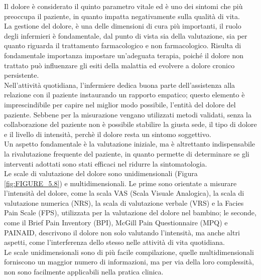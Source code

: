 Il dolore è considerato il quinto parametro vitale ed è uno dei sintomi che più preoccupa il paziente, 
in quanto impatta negativamente sulla qualità di vita.\\ La gestione del dolore, 
è una delle dimensioni di cura più importanti, il ruolo degli infermieri è fondamentale, 
dal punto di vista sia della valutazione, sia per quanto riguarda il trattamento farmacologico e non farmacologico. 
Risulta di fondamentale importanza impostare un’adeguata terapia, poiché il dolore non trattato può 
influenzare gli esiti della malattia ed evolvere a dolore cronico persistente.\\
Nell'attività quotidiana, l'infermiere dedica buona parte dell'assistenza alla relazione con il paziente instaurando
un rapporto empatico; questo elemento è imprescindibile per capire nel miglior modo possibile, l'entità del
dolore del paziente. Sebbe­ne per la misurazione vengano utilizzati metodi validati, senza la collabo­razione del 
paziente non è possibile stabilire la giusta sede, il tipo di dolo­re e il livello di intensità, 
perchè il dolore resta un sintomo soggettivo\cite{BOOK3}.\\
Un aspetto fondamentale è la valutazione iniziale, ma è altret­tanto indispensabile la rivalutazione frequente del paziente, 
in quanto permette di determinare se gli interventi adottati sono stati effi­caci nel ridurre la 
sintomatologia\cite{BOOK3}.\\ 
Le scale di valutazione del dolore sono unidimensionali (Figura \ref{fig:FIGURE_5.8}) e multidimensionali.
Le prime sono orientate a misurare l'intensità del dolore, come 
la scala VAS (Scala Visuale Analogica), 
la scala di valutazione numerica (NRS),
la scala di valutazione verbale (VRS) e la Facies Pain Scale (FPS), utilizzata
per la valutazione del dolore nel bambino;
le seconde, come il Brief Pain Inventory (BPI), McGill Pain Questionnaire (MPQ) 
e PAINAID, descrivono il dolore non solo valutando l'intensità, ma anche altri aspetti, 
come l'interferenza dello stesso nelle attività di vita quotidiana.\\ Le scale unidimensionali sono di più 
facile compilazione, quelle multidimensionali forniscono un maggior numero di informazioni, ma per via della loro 
complessità, non sono facilmente applicabili nella pratica clinica\cite{BOOK3}.

